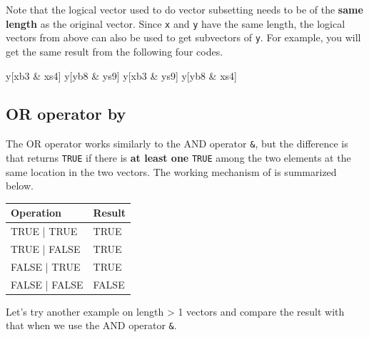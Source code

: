 \documentclass[
]{book}
\newenvironment{Shaded}{\begin{snugshade}}{\end{snugshade}}
\newcommand{\NormalTok}[1]{#1}
\newcommand{\SpecialCharTok}[1]{\textcolor[rgb]{0.00,0.00,0.00}{#1}}
\begin{document}
Note that the logical vector used to do vector subsetting needs to be of the \textbf{same length} as the original vector. Since \texttt{x} and \texttt{y} have the same length, the logical vectors from above can also be used to get subvectors of \texttt{y}. For example, you will get the same result from the following four codes.

\begin{Shaded}
\begin{Highlighting}[]
\NormalTok{y[xb3 }\SpecialCharTok{\&}\NormalTok{ xs4]}
\NormalTok{y[yb8 }\SpecialCharTok{\&}\NormalTok{ ys9]}
\NormalTok{y[xb3 }\SpecialCharTok{\&}\NormalTok{ ys9]}
\NormalTok{y[yb8 }\SpecialCharTok{\&}\NormalTok{ xs4]}
\end{Highlighting}
\end{Shaded}

\hypertarget{or-operator-by}{%
\subsection{\texorpdfstring{OR operator by \texttt{\textbar{}}}{OR operator by \textbar{}}}\label{or-operator-by}}

The OR operator \texttt{\textbar{}} works similarly to the AND operator \texttt{\&}, but the difference is that \texttt{\textbar{}} returns \texttt{TRUE} if there is \textbf{at least one} \texttt{TRUE} among the two elements at the same location in the two vectors. The working mechanism of \texttt{\textbar{}} is summarized below.

\begin{tabular}{l|l}
\hline
Operation & Result\\
\hline
TRUE | TRUE & TRUE\\
\hline
TRUE | FALSE & TRUE\\
\hline
FALSE | TRUE & TRUE\\
\hline
FALSE | FALSE & FALSE\\
\hline
\end{tabular}

Let's try another example on length \textgreater{} 1 vectors and compare the result with that when we use the AND operator \texttt{\&}.
\end{document}
